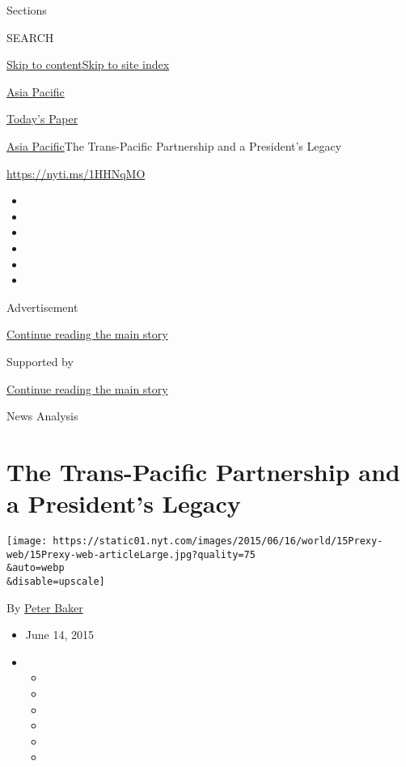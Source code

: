 Sections

SEARCH

\protect\hyperlink{site-content}{Skip to
content}\protect\hyperlink{site-index}{Skip to site index}

\href{https://www.nytimes.com/section/world/asia}{Asia Pacific}

\href{https://myaccount.nytimes.com/auth/login?response_type=cookie\&client_id=vi}{}

\href{https://www.nytimes.com/section/todayspaper}{Today's Paper}

\href{/section/world/asia}{Asia Pacific}\textbar{}The Trans-Pacific
Partnership and a President's Legacy

\url{https://nyti.ms/1HHNqMO}

\begin{itemize}
\item
\item
\item
\item
\item
\item
\end{itemize}

Advertisement

\protect\hyperlink{after-top}{Continue reading the main story}

Supported by

\protect\hyperlink{after-sponsor}{Continue reading the main story}

News Analysis

\hypertarget{the-trans-pacific-partnership-and-a-presidents-legacy}{%
\section{The Trans-Pacific Partnership and a President's
Legacy}\label{the-trans-pacific-partnership-and-a-presidents-legacy}}

\texttt{[image: https://static01.nyt.com/images/2015/06/16/world/15Prexy-web/15Prexy-web-articleLarge.jpg?quality=75\\\&auto=webp\\\&disable=upscale]}

By \href{http://www.nytimes.com/by/peter-baker}{Peter Baker}

\begin{itemize}
\item
  June 14, 2015
\item
  \begin{itemize}
  \item
  \item
  \item
  \item
  \item
  \item
  \end{itemize}
\end{itemize}

